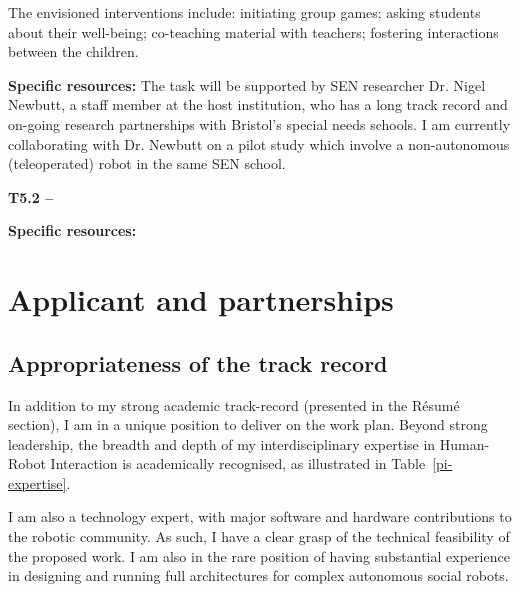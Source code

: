 The envisioned interventions include: initiating group games; asking students
about their well-being; co-teaching material with teachers; fostering
interactions between the children.

\textbf{Specific resources:} The task will be supported by SEN researcher Dr.
Nigel Newbutt, a staff member at the host institution, who has a long track
record and on-going research partnerships with Bristol's special needs schools.
I am currently collaborating with Dr. Newbutt on a pilot study which involve a
non-autonomous (teleoperated) robot in the same SEN school.


\textbf{T5.2 -- }

\textbf{Specific resources:}

\pagebreak



\section{Applicant and partnerships}

\subsection{Appropriateness of the track record}

In addition to my strong academic track-record (presented in the Résumé
section), I am in a unique position to deliver on the \project work plan. Beyond
strong leadership, the breadth and depth of my interdisciplinary expertise in
Human-Robot Interaction is academically recognised, as illustrated in
Table~\ref{pi-expertise}.

I am also a technology expert, with major software and hardware contributions to
the robotic community. As such, I have a clear grasp of the technical
feasibility of the proposed work. I am also in the rare position of having
substantial experience in designing and running full architectures for complex
autonomous social
robots.

